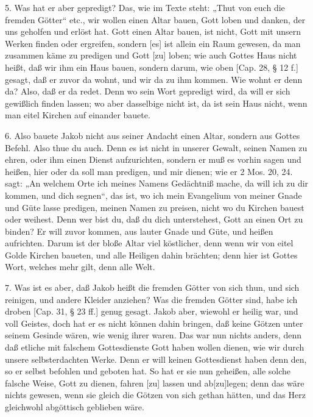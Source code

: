 5. Was hat er aber gepredigt? Das, wie im Texte steht: „Thut von euch die fremden Götter“ etc., wir wollen einen Altar bauen, Gott loben und danken, der uns geholfen und erlöst hat. Gott einen Altar bauen, ist nicht, Gott mit unsern Werken finden oder ergreifen, sondern [es] ist allein ein Raum gewesen, da man zusammen käme zu predigen und Gott [zu] loben; wie auch Gottes Haus nicht heißt, daß wir ihm ein Haus bauen, sondern darum, wie oben [Cap. 28, § 12 f.] gesagt, daß er zuvor da wohnt, und wir da zu ihm kommen. Wie wohnt er denn da? Also, daß er da redet. Denn wo sein Wort gepredigt wird, da will er sich gewißlich finden lassen; wo aber dasselbige nicht ist, da ist sein Haus nicht, wenn man eitel Kirchen auf einander bauete.

6. Also bauete Jakob nicht aus seiner Andacht einen Altar, sondern aus Gottes Befehl. Also thue du auch. Denn es ist nicht in unserer Gewalt, seinen Namen zu ehren, oder ihm einen Dienst aufzurichten, sondern er muß es vorhin sagen und heißen, hier oder da soll man predigen, und mir dienen; wie er 2 Mos. 20, 24. sagt: „An welchem Orte ich meines Namens Gedächtniß mache, da will ich zu dir kommen, und dich segnen“, das ist, wo ich mein Evangelium von meiner Gnade und Güte lasse predigen, meinen Namen zu preisen, nicht wo du Kirchen bauest oder weihest. Denn wer bist
du, daß du dich unterstehest, Gott an einen Ort zu binden? Er will zuvor kommen, aus lauter Gnade und Güte, und heißen aufrichten. Darum ist der bloße Altar viel köstlicher, denn wenn wir von eitel Golde Kirchen baueten, und alle Heiligen dahin brächten; denn hier ist Gottes Wort, welches mehr gilt, denn alle Welt.

7. Was ist es aber, daß Jakob heißt die fremden Götter von sich thun, und sich reinigen, und andere Kleider anziehen? Was die fremden Götter sind, habe ich droben [Cap. 31, § 23 ff.] genug gesagt. Jakob aber, wiewohl er heilig war, und voll Geistes, doch hat er es nicht können dahin bringen, daß keine Götzen unter seinem Gesinde wären, wie wenig ihrer waren. Das war nun nichts anders, denn daß etliche mit falschem Gottesdienste Gott haben wollen dienen, wie wir durch unsere selbsterdachten Werke. Denn er will keinen Gottesdienst haben denn den, so er selbst befohlen und geboten hat. So hat er sie nun geheißen, alle solche falsche Weise, Gott zu dienen, fahren [zu] lassen und ab[zu]legen; denn das wäre nichts gewesen, wenn sie gleich die Götzen von sich gethan hätten, und das Herz gleichwohl abgöttisch geblieben wäre.

